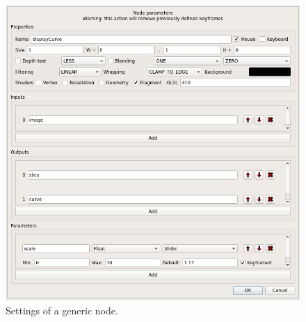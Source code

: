 
\begin{figure}[htb]
  \centering \includegraphics[width=\linewidth]{imgs/generic-settings.png} 
  \caption{\label{fig:generic-settings}Settings of a generic node.}
\end{figure}

